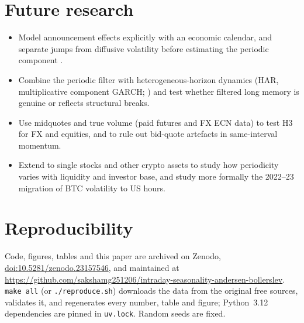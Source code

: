 \documentclass[11pt,a4paper]{article}
\begin{document}
\section{Future research}
\label{sec:future}
\begin{itemize}
\item Model announcement effects explicitly \citep{AB1998} with an economic calendar, and separate jumps from diffusive volatility before estimating the periodic component \citep{Boudt2011}.
\item Combine the periodic filter with heterogeneous-horizon dynamics (HAR, multiplicative component GARCH; \citealp{Corsi2009,Engle2012}) and test whether filtered long memory is genuine or reflects structural breaks.
\item Use midquotes and true volume (paid futures and FX ECN data) to test H3 for FX and equities, and to rule out bid-quote artefacts in same-interval momentum.
\item Extend to single stocks and other crypto assets to study how periodicity varies with liquidity and investor base, and study more formally the 2022--23 migration of BTC volatility to US hours.
\end{itemize}

\clearpage
\section*{Reproducibility}
Code, figures, tables and this paper are archived on Zenodo, \href{https://doi.org/10.5281/zenodo.23157546}{doi:10.5281/zenodo.23157546}, and maintained at \url{https://github.com/sakshamg251206/intraday-seasonality-andersen-bollerslev}. \texttt{make all} (or \texttt{./reproduce.sh}) downloads the data from the original free sources, validates it, and regenerates every number, table and figure; Python~3.12 dependencies are pinned in \texttt{uv.lock}. Random seeds are fixed.
\end{document}
